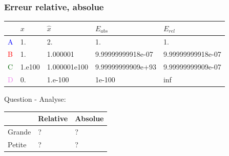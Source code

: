 \documentclass{beamer}
\begin{document}

\def\blueA{\textcolor{blue}{A}}
\def\redB{\textcolor{red}{B}}
\def\dgrenC{\textcolor{darkgreen}{C}}
\def\violetD{\textcolor{violet}{D}}

\begin{frame}
\frametitle{Erreur relative, absolue}


\begin{example}

\begin{footnotesize}
\begin{center}
\begin{tabular}{lllll}
& $x$ & $\hat{x}$ & $E_{abs}$ & $E_{rel}$ \\
\hline
\blueA & 1. & 2. & 1. & 1. \\
\redB & 1. & 1.000001 & 9.99999999918e-07& 9.99999999918e-07\\
\dgrenC & 1.e100 & 1.000001e100 & 9.99999999909e+93 & 9.99999999909e-07 \\
\violetD & 0. & 1.e-100 & 1e-100 & inf
\end{tabular}
\end{center}
\end{footnotesize}

Question - Analyse:

\begin{tabular}{l|l|l}
& Relative & Absolue \\
\hline
Grande & ?  & ? \\
Petite & ? & ?
\end{tabular}

\end{example}

\end{frame}
\end{document}
